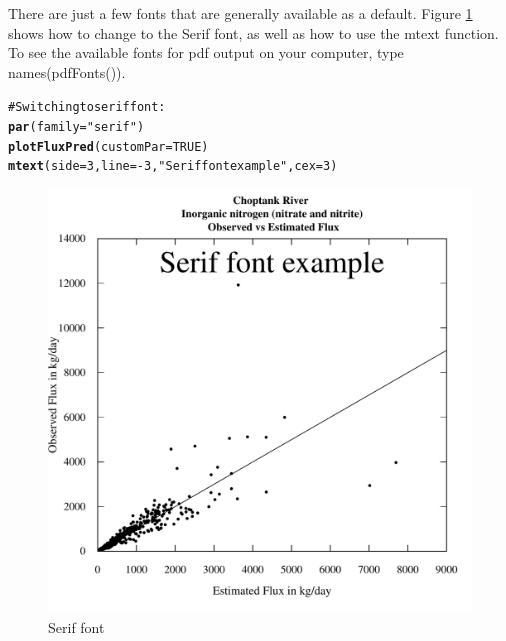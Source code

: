 \documentclass[a4paper,11pt]{article}\usepackage{graphicx, color}
\makeatletter
\newcommand{\hlfunctioncall}[1]{\textcolor[rgb]{0.501960784313725,0,0.329411764705882}{\textbf{#1}}}%
\newcommand{\hlstring}[1]{\textcolor[rgb]{0.6,0.6,1}{#1}}%
\newcommand{\hlcomment}[1]{\textcolor[rgb]{0.180392156862745,0.6,0.341176470588235}{#1}}%
\newenvironment{kframe}{%
 \def\at@end@of@kframe{}%
 \ifinner\ifhmode%
  \def\at@end@of@kframe{\end{minipage}}%
  \begin{minipage}{\columnwidth}%
 \fi\fi%
 \def\FrameCommand##1{\hskip\@totalleftmargin \hskip-\fboxsep
 \colorbox{shadecolor}{##1}\hskip-\fboxsep
     \hskip-\linewidth \hskip-\@totalleftmargin \hskip\columnwidth}%
 \MakeFramed {\advance\hsize-\width
   \@totalleftmargin\z@ \linewidth\hsize
   \@setminipage}}%
 {\par\unskip\endMakeFramed%
 \at@end@of@kframe}
\newenvironment{knitrout}{}{} %
\makeatother
\begin{document}
There are just a few fonts that are generally available as a default. Figure \ref{fig:easyFontChange} shows how to change to the Serif font, as well as how to use the mtext function. To see the available fonts for pdf output on your computer, type names(pdfFonts()).
\begin{knitrout}
\color{fgcolor}\begin{kframe}
\begin{alltt}
\hlcomment{# Switching to serif font:}
\hlfunctioncall{par}(family=\hlstring{"serif"})
\hlfunctioncall{plotFluxPred}(customPar=TRUE)
\hlfunctioncall{mtext}(side=3,line=-3,\hlstring{"Serif font example"},cex=3)
\end{alltt}
\end{kframe}\begin{figure}[]

\includegraphics[width=1\linewidth,height=1\linewidth]{figure/easyFontChange} \caption[Serif font]{Serif font\label{fig:easyFontChange}}
\end{figure}


\end{knitrout}
\end{document}
